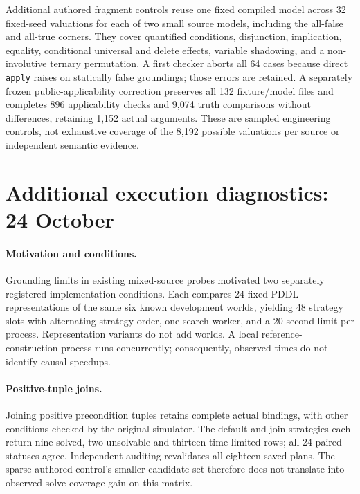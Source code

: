 \documentclass[letterpaper]{article}
\begin{document}
Additional authored fragment controls reuse one fixed compiled model across 32 fixed-seed valuations for each of two small source models, including the all-false and all-true corners. They cover quantified conditions, disjunction, implication, equality, conditional universal and delete effects, variable shadowing, and a non-involutive ternary permutation. A first checker aborts all 64 cases because direct \texttt{apply} raises on statically false groundings; those errors are retained. A separately frozen public-applicability correction preserves all 132 fixture/model files and completes 896 applicability checks and 9,074 truth comparisons without differences, retaining 1,152 actual arguments. These are sampled engineering controls, not exhaustive coverage of the 8,192 possible valuations per source or independent semantic evidence.

\section{Additional execution diagnostics: 24 October}
\paragraph{Motivation and conditions.}
Grounding limits in existing mixed-source probes motivated two separately registered implementation conditions. Each compares 24 fixed PDDL representations of the same six known development worlds, yielding 48 strategy slots with alternating strategy order, one search worker, and a 20-second limit per process. Representation variants do not add worlds. A local reference-construction process runs concurrently; consequently, observed times do not identify causal speedups.

\paragraph{Positive-tuple joins.}
Joining positive precondition tuples retains complete actual bindings, with other conditions checked by the original simulator. The default and join strategies each return nine solved, two unsolvable and thirteen time-limited rows; all 24 paired statuses agree. Independent auditing revalidates all eighteen saved plans. The sparse authored control's smaller candidate set therefore does not translate into observed solve-coverage gain on this matrix.
\end{document}

